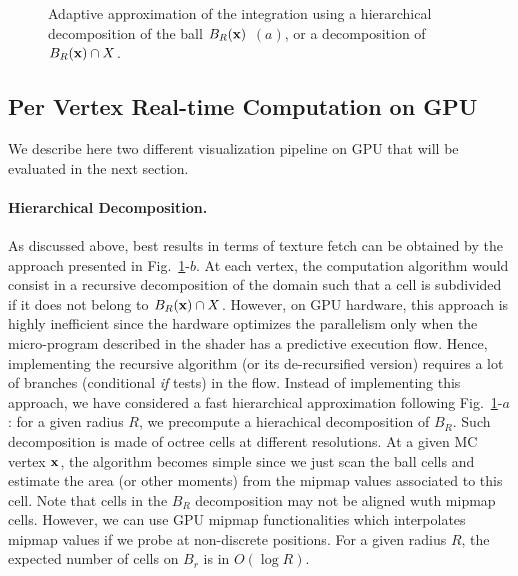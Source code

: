 \documentclass{llncs}
\begin{document}
\begin{figure}
  \begin{center}
  \end{center}
  \caption{Adaptive approximation of the integration using a
    hierarchical decomposition of the ball $B_R(\mathbf{x})$ $(a)$, or a decomposition of $B_R(\mathbf{x})\cap X$.}
  \label{fig:approx2}
\end{figure}


\subsection{Per Vertex Real-time Computation on GPU}

We describe here two different visualization pipeline on GPU that will
be evaluated in the next section.



\paragraph{Hierarchical Decomposition.}  As discussed above, best
results in terms of texture fetch can be obtained by the approach
presented in Fig.~\ref{fig:approx2}-$b$. At each vertex, the
computation algorithm would consist in a recursive decomposition of
the domain such that a cell is subdivided if it does not belong to
$B_R(\mathbf{x})\cap X$. However, on GPU hardware, this approach is
highly inefficient since the hardware optimizes the parallelism only
when the micro-program described in the shader has a predictive
execution flow. Hence, implementing the recursive algorithm (or its
de-recursified version) requires a lot of branches (conditional
\emph{if} tests) in the flow. Instead of implementing this approach,
we have considered a fast hierarchical approximation following
Fig.~\ref{fig:approx2}-$a$: for a given radius $R$, we precompute a
hierachical decomposition of $B_R$. Such decomposition is made of
octree cells at different resolutions. At a given MC vertex $\mathbf{x}$, the
algorithm becomes simple since we just scan  the ball cells and estimate
the area (or other moments) from the mipmap values associated to this
cell. Note that cells in the $B_R$ decomposition may not be aligned
wuth mipmap cells. However, we can use GPU mipmap functionalities
which interpolates mipmap values if we probe at non-discrete
positions. For a given radius $R$, the expected number of cells on
$B_r$ is in $O(\log{R})$.
\end{document}
